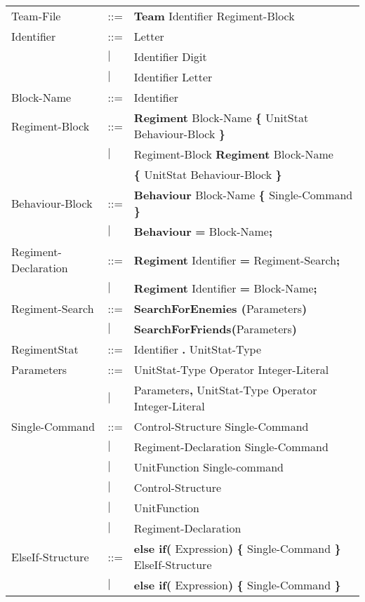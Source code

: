 \begin{center}
		\begin{longtable}{l l l}
		\endfirsthead
		\endhead
Team-File					&	::=	&{\bf Team} Identifier Regiment-Block\\
Identifier					&	::=	&Letter\\
							&$\mid$	&Identifier Digit\\
							&$\mid$	&Identifier Letter\\
Block-Name					&	::=	&Identifier\\
Regiment-Block				&	::=	&{\bf Regiment} Block-Name {\bf \{ } UnitStat Behaviour-Block \bf{\} }\\
							&$\mid$	&Regiment-Block {\bf Regiment} Block-Name\\
							&		&{\bf \{ } UnitStat Behaviour-Block \bf{\} }\\
Behaviour-Block				&	::=	&{\bf Behaviour} Block-Name {\bf \{} Single-Command {\bf \}}  \\
							&$\mid$	& {\bf Behaviour} {\bf = } Block-Name{\bf ;} \\
Regiment-Declaration			&	::=	&{\bf Regiment} Identifier {\bf =} Regiment-Search{\bf ;}\\
							&$\mid$	&{\bf Regiment} Identifier {\bf =} Block-Name{\bf ;}\\
Regiment-Search				&	::=	&{\bf SearchForEnemies (}Parameters{\bf)}\\
							&$\mid$	&{\bf SearchForFriends(}Parameters{\bf)}\\
RegimentStat				&	::=	&Identifier {\bf.} UnitStat-Type \\
Parameters					&	::=	&UnitStat-Type Operator Integer-Literal\\
 							&$\mid$	&Parameters{\bf ,} UnitStat-Type Operator Integer-Literal\\
Single-Command				&	::=	&Control-Structure Single-Command \\
							&$\mid$	&Regiment-Declaration Single-Command\\
							&$\mid$	&UnitFunction Single-command\\
							&$\mid$	&Control-Structure\\
							&$\mid$	&UnitFunction\\
							&$\mid$	&Regiment-Declaration\\
ElseIf-Structure			&	::=	&{\bf else if( } Expression{\bf )} {\bf \{ } Single-Command {\bf \} } ElseIf-Structure\\
							&$\mid$	&{\bf else if( } Expression{\bf )} {\bf \{ } Single-Command {\bf \} } \\

\end{longtable}
\end{center}
